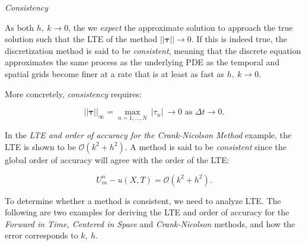 \vspace{0.25cm}
 \noindent\textit{Consistency}
 \vspace{0.25cm}
 
As both $h, \ k \rightarrow 0$, the we \textit{expect} the approximate solution to approach the true solution such that the LTE of the method $||\boldsymbol{\tau}|| \rightarrow 0$. If this is indeed true, the discretization method is said to be \textit{consistent}, meaning that the discrete equation approximates the same process as the underlying PDE as the temporal and spatial grids become finer at a rate that is at least as fast as $h, \ k \rightarrow 0$.

More concretely, \textit{consistency} requires: 

\begin{equation}
    ||\boldsymbol{\tau}||_{\infty} = \max_{n = 1, \dots, N} \ |\tau_n| \ \rightarrow 0 \text{ as } \Delta t \rightarrow 0. 
\end{equation}

In the \textit{LTE and order of accuracy for the Crank-Nicolson Method} example, the LTE is shown to be $\mathcal{O}(k^2+h^2)$. A method is said to be \textit{consistent} since the global order of accuracy will agree with the order of the LTE: 

\begin{equation}
    U_m^n - u(X,T) = \mathcal{O}(k^2 + h^2). 
\end{equation}
 
 To determine whether a method is consistent, we need to analyze LTE. The following are two examples for deriving the LTE and order of accuracy for the \textit{Forward in Time, Centered in Space} and \textit{Crank-Nicolson} methods, and how the error corresponds to $k, \ h$. 






